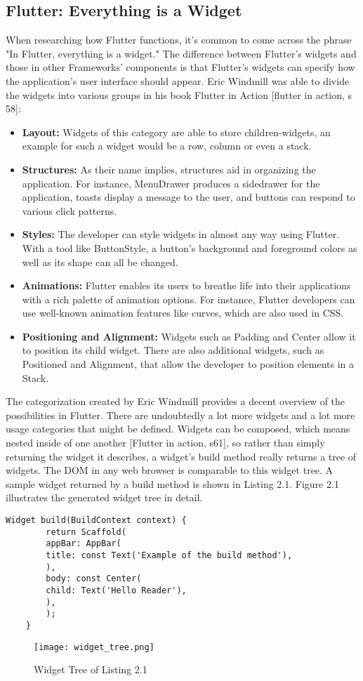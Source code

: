 \subsection{Flutter: Everything is a Widget}
When researching how Flutter functions, it's common to come across the phrase "In Flutter, everything is a widget." The difference between Flutter's widgets and those in other Frameworks' components is that Flutter's widgets can specify how the application's user interface should appear. Eric Windmill was able to divide the widgets into various groups in his book Flutter in Action [flutter in action, s 58]:

\begin{itemize}
	\item \textbf{Layout:} 
	Widgets of this category are able to store children-widgets, an example for such a widget would be a row, column or even a stack.  
	\item \textbf{Structures:} 
	As their name implies, structures aid in organizing the application.
	For instance, MenuDrawer produces a sidedrawer for the application, toasts display a message to the user, and buttons can respond to various click patterns. 
	\item \textbf{Styles:} 
	The developer can style widgets in almost any way using Flutter. With a tool like ButtonStyle, a button's background and foreground colors as well as its shape can all be changed.
	\item \textbf{Animations:} 
	Flutter enables its users to breathe life into their applications with a rich palette of animation options. For instance, Flutter developers can use well-known animation features like curves, which are also used in CSS. 
	\item \textbf{Positioning and Alignment:} 
	Widgets such as Padding and Center allow it to position its child widget. There are also additional widgets, such as Positioned and Alignment, that allow the developer to position elements in a Stack.
\end{itemize}
\noindent 
The categorization created by Eric Windmill provides a decent overview of the possibilities in Flutter. There are undoubtedly a lot more widgets and a lot more usage categories that might be defined. Widgets can be composed, which means nested inside of one another [Flutter in action, s61], so rather than simply returning the widget it describes, a widget's build method really returns a tree of widgets. The DOM in any web browser is comparable to this widget tree. A sample widget returned by a build method is shown in Listing 2.1. Figure 2.1 illustrates the generated widget tree in detail.
\begin{lstlisting}[caption=Flutter Scaffold Example]
	Widget build(BuildContext context) {
		return Scaffold(
		appBar: AppBar(
		title: const Text('Example of the build method'),
		),
		body: const Center(
		child: Text('Hello Reader'),
		),
		);
	}
\end{lstlisting}
\begin{figure}[H]
	\centering
	\texttt{[image: widget\_tree.png]}
	\caption[Widget Tree of Listing 2.1]{Widget Tree of Listing 2.1}
\end{figure}
